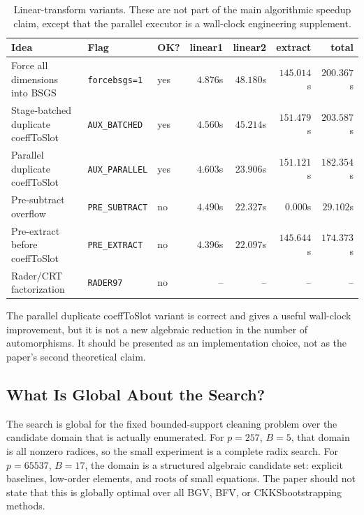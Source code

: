 \documentclass[a4paper,runningheads]{llncs}
\newcommand{\BGV}{\textsf{BGV}}
\newcommand{\BFV}{\textsf{BFV}}
\newcommand{\CKKS}{\textsf{CKKS}}
\begin{document}
\begin{table}[t]
\centering
\caption{Linear-transform variants. These are not part of the main algorithmic
speedup claim, except that the parallel executor is a wall-clock engineering
supplement.}
\label{tab:linear_attempts}
\scriptsize
\begin{tabular}{p{3.0cm}p{2.3cm}p{1.2cm}rrrr}
\toprule
\textbf{Idea} & \textbf{Flag} & \textbf{OK?} &
\textbf{linear1} & \textbf{linear2} & \textbf{extract} & \textbf{total} \\
\midrule
Force all dimensions into BSGS & \texttt{forcebsgs=1} & yes
& $4.876$s & $48.180$s & $145.014$s & $200.367$s \\
Stage-batched duplicate coeffToSlot & \texttt{AUX\_BATCHED} & yes
& $4.560$s & $45.214$s & $151.479$s & $203.587$s \\
Parallel duplicate coeffToSlot & \texttt{AUX\_PARALLEL} & yes
& $4.603$s & $23.906$s & $151.121$s & $182.354$s \\
Pre-subtract overflow & \texttt{PRE\_SUBTRACT} & no
& $4.490$s & $22.327$s & $0.000$s & $29.102$s \\
Pre-extract before coeffToSlot & \texttt{PRE\_EXTRACT} & no
& $4.396$s & $22.097$s & $145.644$s & $174.373$s \\
Rader/CRT factorization & \texttt{RADER97} & no
& -- & -- & -- & -- \\
\bottomrule
\end{tabular}
\end{table}

The parallel duplicate coeffToSlot variant is correct and gives a useful
wall-clock improvement, but it is not a new algebraic reduction in the number
of automorphisms. It should be presented as an implementation choice, not as
the paper's second theoretical claim.

\subsection{What Is Global About the Search?}

The search is global for the fixed bounded-support cleaning problem over the
candidate domain that is actually enumerated.  For $p=257$, $B=5$, that domain
is all nonzero radices, so the small experiment is a complete radix search.
For $p=65537$, $B=17$, the domain is a structured algebraic candidate set:
explicit baselines, low-order elements, and roots of small equations.  The
paper should not state that this is globally optimal over all \BGV,
\BFV, or \CKKS bootstrapping methods.
\end{document}
